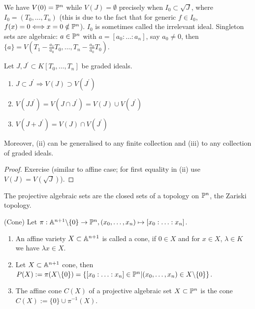 \documentclass[a4paper,11pt]{article}
\begin{document}
			\begin{remark}
				We have $V(0)=\P^n$ while $V(J)=\emptyset$ precisely when $I_0\subset\sqrt{J}$, where $I_0=(T_0,\dots,T_n)$ (this is due to the fact that for generic $f\in I_0$, $f(x)=0\Longleftrightarrow x=0\notin\P^n$). $I_0$ is sometimes called the irrelevant ideal. Singleton sets are algebraic: $a\in\P^n$ with $a=[a_0:\ldots:a_n]$, say $a_0\neq0$, then $\{a\}=V(T_1-\frac{a_1}{a_0}T_0,\dots,T_n-\frac{a_n}{a_0}T_0)$. 
			\end{remark}

			\begin{prop}
				Let $J,J^\prime\subset K[T_0,\dots,T_n]$ be graded ideals.
				\begin{enumerate}
					\item $J\subset J^\prime\Longrightarrow V(J)\supset V(J^\prime)$
					\item $V(JJ^\prime)=V(J\cap J^\prime)=V(J)\cup V(J^\prime)$
					\item $V(J+J^\prime)=V(J)\cap V(J^\prime)$
				\end{enumerate}
				Moreover, (ii) can be generalised to any finite collection and (iii) to any collection of graded ideals.
			\end{prop}
			\begin{proof}\renewcommand{\qedsymbol}{}
				Exercise (similar to affine case; for first equality in (ii) use $V(J)=V(\sqrt{J})$).
			\end{proof}\renewcommand{\qedsymbol}{$\square$}

			The projective algebraic sets are the closed sets of a topology on $\P^n$, the Zariski topology.

			\begin{defi}\label{def--cone}
				(Cone) Let $\pi:\AA^{n+1}\backslash\{0\}\rightarrow\P^n,(x_0,\dots,x_n)\mapsto\x{n}$.
				\begin{enumerate}
					\item An affine variety $X\subset\AA^{n+1}$ is called a cone, if $0\in X$ and for $x\in X$, $\lambda\in K$ we have $\lambda x\in X$.
					\item Let $X\subset\AA^{n+1}$ cone, then $P(X):=\pi(X\backslash\{0\})=\{\x{n}\in\P^n|(x_0,\dots,x_n)\in X\backslash\{0\}\}$.
					\item The affine cone $C(X)$ of a projective algebraic set $X\subset\P^n$ is the cone $C(X):=\{0\}\cup\pi^{-1}(X)$.
				\end{enumerate}
			\end{defi}
\end{document}
